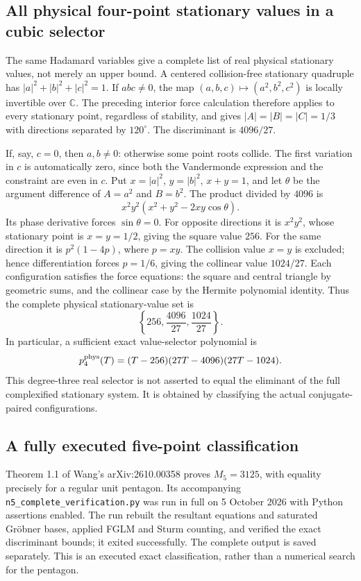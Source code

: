 \documentclass[11pt]{article}
\theoremstyle{remark}
\newcommand{\C}{\mathbb C}
\numberwithin{equation}{section}
\begin{document}
\subsection{All physical four-point stationary values in a cubic selector}
\label{sec:four-critical-values}
The same Hadamard variables give a complete list of real physical
stationary values, not merely an upper bound. A centered
collision-free stationary quadruple has
$|a|^2+|b|^2+|c|^2=1$.
If $abc\ne0$, the map $(a,b,c)\mapsto(a^2,b^2,c^2)$ is locally
invertible over $\C$. The preceding interior force calculation
therefore applies to every stationary point, regardless of stability,
and gives $|A|=|B|=|C|=1/3$ with directions separated by
$120^\circ$. The discriminant is $4096/27$.

If, say, $c=0$, then $a,b\ne0$: otherwise some point roots collide.
The first variation in $c$ is automatically zero, since both the
Vandermonde expression and the constraint are even in $c$.
Put $x=|a|^2$, $y=|b|^2$, $x+y=1$, and let $\theta$ be the
argument difference of $A=a^2$ and $B=b^2$. The product divided
by $4096$ is
\[
                 x^2y^2(x^2+y^2-2xy\cos\theta).
\]
Its phase derivative forces $\sin\theta=0$.
For opposite directions it is $x^2y^2$, whose stationary point
is $x=y=1/2$, giving the square value $256$.
For the same direction it is $p^2(1-4p)$, where $p=xy$.
The collision value $x=y$ is excluded; hence differentiation
forces $p=1/6$, giving the collinear value $1024/27$.
Each configuration satisfies the force equations: the square and
central triangle by geometric sums, and the collinear case by the
Hermite polynomial identity. Thus the complete physical
stationary-value set is
\[
                      \left\{256,\frac{4096}{27},\frac{1024}{27}\right\}.
\]
In particular, a sufficient exact value-selector polynomial is
\begin{equation}\label{eq:four-physical-selector}
          p_4^{\rm phys}(T)=(T-256)(27T-4096)(27T-1024).
\end{equation}
This degree-three real selector is not asserted to equal the
eliminant of the full complexified stationary system. It is
obtained by classifying the actual conjugate-paired configurations.

\subsection{A fully executed five-point classification}
Theorem 1.1 of Wang's arXiv:2610.00358 proves $M_5=3125$,
with equality precisely for a regular unit pentagon. Its
accompanying \texttt{n5\_complete\_verification.py} was run in full
on 5 October 2026 with Python assertions enabled. The run rebuilt
the resultant equations and saturated Gr\"obner bases, applied
FGLM and Sturm counting, and verified the exact discriminant bounds;
it exited successfully. The complete output is saved separately.
This is an executed exact classification, rather than a numerical
search for the pentagon.
\end{document}
